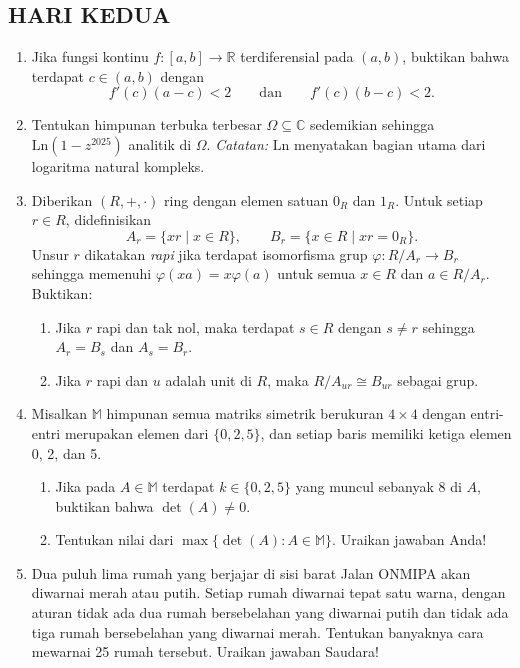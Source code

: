 \documentclass[12pt,twoside]{article}
\begin{document}
\subsection{HARI KEDUA}
\begin{enumerate}
    \item Jika fungsi kontinu $f : [a,b] \to \mathbb{R}$ terdiferensial pada $(a,b)$, buktikan bahwa terdapat $c \in (a,b)$ dengan
          \[
              f'(c)(a-c) < 2 \qquad \text{dan} \qquad f'(c)(b-c) < 2.
          \]

    \item Tentukan himpunan terbuka terbesar $\Omega \subseteq \mathbb{C}$ sedemikian sehingga $\mathrm{Ln}(1 - z^{2025})$ analitik di $\Omega$.
          \emph{Catatan:} $\mathrm{Ln}$ menyatakan bagian utama dari logaritma natural kompleks.

    \item Diberikan $(R, +, \cdot)$ ring dengan elemen satuan $0_R$ dan $1_R$. Untuk setiap $r \in R$, didefinisikan
          \[
              A_r = \{xr \mid x \in R\}, \qquad B_r = \{x \in R \mid xr = 0_R\}.
          \]
          Unsur $r$ dikatakan \emph{rapi} jika terdapat isomorfisma grup $\varphi : R/A_r \to B_r$ sehingga memenuhi
          $\varphi(xa) = x\varphi(a)$ untuk semua $x \in R$ dan $a \in R/A_r$. Buktikan:

          \begin{enumerate}
              \item Jika $r$ rapi dan tak nol, maka terdapat $s \in R$ dengan $s \ne r$ sehingga $A_r = B_s$ dan $A_s = B_r$.
              \item Jika $r$ rapi dan $u$ adalah unit di $R$, maka $R/A_{ur} \cong B_{ur}$ sebagai grup.
          \end{enumerate}

    \item Misalkan $\mathbb{M}$ himpunan semua matriks simetrik berukuran $4 \times 4$ dengan entri-entri merupakan elemen dari $\{0,2,5\}$, dan setiap baris memiliki ketiga elemen 0, 2, dan 5.

          \begin{enumerate}
              \item Jika pada $A \in \mathbb{M}$ terdapat $k \in \{0,2,5\}$ yang muncul sebanyak 8 di $A$, buktikan bahwa $\det(A) \ne 0$.
              \item Tentukan nilai dari $\max\{\det(A) : A \in \mathbb{M}\}$. Uraikan jawaban Anda!
          \end{enumerate}

    \item Dua puluh lima rumah yang berjajar di sisi barat Jalan ONMIPA akan diwarnai merah atau putih.
          Setiap rumah diwarnai tepat satu warna, dengan aturan tidak ada dua rumah bersebelahan yang diwarnai putih dan tidak ada tiga rumah bersebelahan yang diwarnai merah.
          Tentukan banyaknya cara mewarnai 25 rumah tersebut.
          Uraikan jawaban Saudara!
\end{enumerate}
\end{document}
